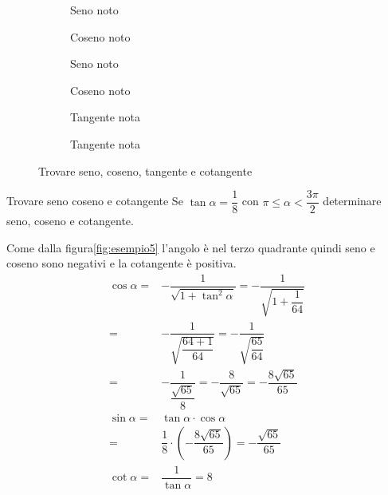 \begin{figure}
\begin{subfigure}[b]{.5\linewidth}
\centering

\caption{Seno noto}\label{fig:esempio1}
\end{subfigure}%
\begin{subfigure}[b]{.5\linewidth}
\centering

\caption{Coseno noto}\label{fig:esempio2}
\end{subfigure}%
\quad
\begin{subfigure}[b]{.5\linewidth}
\centering

\caption{Seno noto}\label{fig:esempio3}
\end{subfigure}%
\begin{subfigure}[b]{.5\linewidth}
\centering

\caption{Coseno noto}\label{fig:esempio4}
\end{subfigure}%
\quad
\begin{subfigure}[b]{.5\linewidth}
	\centering
	
	\caption{Tangente nota}\label{fig:esempio5}
\end{subfigure}%
\begin{subfigure}[b]{.5\linewidth}
	\centering
	
	\caption{Tangente nota}\label{fig:esempio6}
\end{subfigure}%
\caption{Trovare seno, coseno, tangente e cotangente}
\end{figure}
\begin{esempiot}{Trovare seno coseno e cotangente}{}
Se $\tan\alpha=\dfrac{1}{8}$ con $\pi\leq\alpha<\dfrac{3\pi}{2}$ determinare seno, coseno e cotangente.
\end{esempiot}
Come dalla figura\nobs\vref{fig:esempio5} l'angolo è nel terzo quadrante quindi seno e coseno sono negativi e la cotangente è positiva.
\begin{align*}
\cos\alpha=&-\dfrac{1}{\sqrt{1+\tan^2\alpha}}=-\dfrac{1}{\sqrt{1+\dfrac{1}{64}}}\\
=&-\dfrac{1}{\sqrt{\dfrac{64+1}{64}}}=-\dfrac{1}{\sqrt{\dfrac{65}{64}}}\\
=&-\dfrac{1}{\dfrac{\sqrt{65}}{8}}=-\dfrac{8}{\sqrt{65}}=-\dfrac{8\sqrt{65}}{65}\\
\sin\alpha=&\tan\alpha\cdot\cos\alpha\\
=&\dfrac{1}{8}\cdot\left(-\dfrac{8\sqrt{65}}{65}\right)=-\dfrac{\sqrt{65}}{65}\\
\cot\alpha=&\dfrac{1}{\tan\alpha}=8\\
\end{align*}
